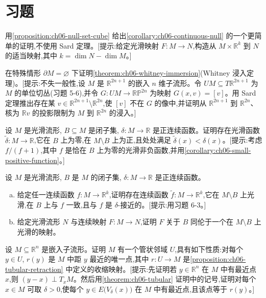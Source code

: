 \documentclass[../../main.tex]{subfiles}
\begin{document}
\section{习题}\label{section:ch06-习题}

\begin{exercise}\label{exercise:ch06-01}
用\cref{proposition:ch06-null-set-cube} 给出\cref{corollary:ch06-continuous-null} 的一个更简单的证明,不使用 Sard 定理。[提示:给定光滑映射 $F:M\to N$,构造从 $M\times\mathbb{R}^k$ 到 $N$ 的适当映射,其中 $k=\dim N-\dim M$。]
\end{exercise}

\begin{exercise}\label{exercise:ch06-02}
在特殊情形 $\partial M=\varnothing$ 下证明\cref{theorem:ch06-whitney-immersion}(Whitney 浸入定理)。[提示:不失一般性,设 $M$ 是 $\mathbb{R}^{2n+1}$ 的嵌入 $n$ 维子流形。令 $UM\subseteq T\mathbb{R}^{2n+1}$ 为 $M$ 的单位切丛(习题 5-6),并令 $G:UM\to\mathbb{RP}^{2n}$ 为映射 $G(x,v)=[v]$。用 Sard 定理推出存在某 $v\in\mathbb{R}^{2n+1}\setminus\mathbb{R}^{2n}$,使 $[v]$ 不在 $G$ 的像中,并证明从 $\mathbb{R}^{2n+1}$ 到 $\mathbb{R}^{2n}$、核为 $\mathbb{R}v$ 的投影限制为 $M$ 到 $\mathbb{R}^{2n}$ 的浸入。]
\end{exercise}

\begin{exercise}\label{exercise:ch06-03}
设 $M$ 是光滑流形, $B\subseteq M$ 是闭子集, $\delta:M\to\mathbb{R}$ 是正连续函数。证明存在光滑函数 $\widetilde{\delta}:M\to\mathbb{R}$,它在 $B$ 上为零,在 $M\setminus B$ 上为正,且处处满足 $\widetilde{\delta}(x)<\delta(x)$。[提示:考虑 $f/(f+1)$,其中 $f$ 是恰在 $B$ 上为零的光滑非负函数,并用\cref{corollary:ch06-small-positive-function}。]
\end{exercise}

\begin{exercise}\label{exercise:ch06-04}
设 $M$ 是光滑流形, $B$ 是 $M$ 的闭子集, $\delta:M\to\mathbb{R}$ 是正连续函数。
\begin{enumerate}[(a)]
\item 给定任一连续函数 $f:M\to\mathbb{R}^k$,证明存在连续函数 $\widetilde{f}:M\to\mathbb{R}^k$,它在 $M\setminus B$ 上光滑,在 $B$ 上与 $f$ 一致,且与 $f$ 是 $\delta$-接近的。[提示:用习题 6-3。]
\item 给定光滑流形 $N$ 与连续映射 $F:M\to N$,证明 $F$ 关于 $B$ 同伦于一个在 $M\setminus B$ 上光滑的映射。
\end{enumerate}
\end{exercise}

\begin{exercise}\label{exercise:ch06-05}
设 $M\subseteq\mathbb{R}^n$ 是嵌入子流形。证明 $M$ 有一个管状邻域 $U$,具有如下性质:对每个 $y\in U$, $r(y)$ 是 $M$ 中距 $y$ 最近的唯一点,其中 $r:U\to M$ 是\cref{proposition:ch06-tubular-retraction} 中定义的收缩映射。[提示:先证明若 $y\in\mathbb{R}^n$ 在 $M$ 中有最近点 $x$,则 $(y-x)\perp T_xM$。然后用\cref{theorem:ch06-tubular} 证明中的记号,证明对每个 $x\in M$ 可取 $\delta>0$,使每个 $y\in E\bigl(V_\delta(x)\bigr)$ 在 $M$ 中有最近点,且该点等于 $r(y)$。]
\end{exercise}
\end{document}
